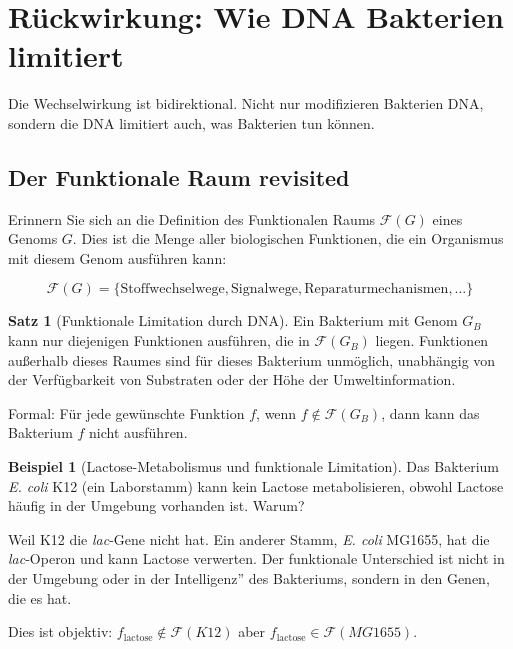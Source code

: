 \documentclass[a4paper,12pt]{article}
\theoremstyle{definition}
\newtheorem{beispiel}{Beispiel}
\newtheorem{satz}{Satz}
\begin{document}
\section{Rückwirkung: Wie DNA Bakterien limitiert}


Die Wechselwirkung ist bidirektional. Nicht nur modifizieren Bakterien DNA, sondern die DNA limitiert auch, was Bakterien tun können.

\subsection{Der Funktionale Raum revisited}

Erinnern Sie sich an die Definition des Funktionalen Raums $\mathcal{F}(G)$ eines Genoms $G$. Dies ist die Menge aller biologischen Funktionen, die ein Organismus mit diesem Genom ausführen kann:

\[
\mathcal{F}(G) = \{ \text{Stoffwechselwege}, \text{Signalwege}, \text{Reparaturmechanismen}, \ldots \}
\]

\begin{satz}[Funktionale Limitation durch DNA]
Ein Bakterium mit Genom $G_B$ kann nur diejenigen Funktionen ausführen, die in $\mathcal{F}(G_B)$ liegen. Funktionen außerhalb dieses Raumes sind für dieses Bakterium unmöglich, unabhängig von der Verfügbarkeit von Substraten oder der Höhe der Umweltinformation.

Formal: Für jede gewünschte Funktion $f$, wenn $f \notin \mathcal{F}(G_B)$, dann kann das Bakterium $f$ nicht ausführen.
\end{satz}

\begin{beispiel}[Lactose-Metabolismus und funktionale Limitation]
Das Bakterium \textit{E. coli} K12 (ein Laborstamm) kann kein Lactose metabolisieren, obwohl Lactose häufig in der Umgebung vorhanden ist. Warum?

Weil K12 die \textit{lac}-Gene nicht hat. Ein anderer Stamm, \textit{E. coli} MG1655, hat die \textit{lac}-Operon und kann Lactose verwerten. Der funktionale Unterschied ist nicht in der Umgebung oder in der Intelligenz'' des Bakteriums, sondern in den Genen, die es hat.

Dies ist objektiv: $f_{\text{lactose}} \notin \mathcal{F}(K12)$ aber $f_{\text{lactose}} \in \mathcal{F}(MG1655)$.
\end{beispiel}
\end{document}
